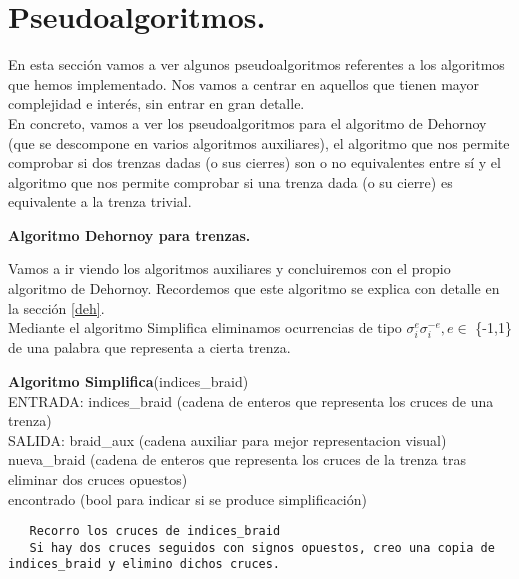
\section{Pseudoalgoritmos.}
En esta sección vamos a ver algunos pseudoalgoritmos referentes a los algoritmos que hemos implementado. Nos vamos a centrar en aquellos que tienen mayor complejidad e interés, sin entrar en gran detalle. \\

En concreto, vamos a ver los pseudoalgoritmos para el algoritmo de Dehornoy (que se descompone en varios algoritmos auxiliares), el algoritmo que nos permite comprobar si dos trenzas dadas (o sus cierres) son o no equivalentes entre sí y el algoritmo que nos permite comprobar si una trenza dada (o su cierre) es equivalente a la trenza trivial.\\

\begin{center}
	\textbf{Algoritmo Dehornoy para trenzas.}
\end{center} 
Vamos a ir viendo los algoritmos auxiliares y concluiremos con el propio algoritmo de Dehornoy. Recordemos que este algoritmo se explica con detalle en la sección \ref{deh}.\\

Mediante el algoritmo Simplifica eliminamos ocurrencias de tipo $\sigma_{i}^{e}\sigma_{i}^{-e}, e \in$ \{-1,1\} de una palabra que representa a cierta trenza. 

\begin{alg}
	\textbf{Algoritmo Simplifica}(indices\_braid)\\
	ENTRADA: indices\_braid (cadena de enteros que representa los cruces de una trenza)\\
	SALIDA: \hspace{0.4cm} braid\_aux (cadena auxiliar para mejor representacion visual) \\
    \hspace*{2.2cm} nueva\_braid (cadena de enteros que representa los cruces de la trenza tras eliminar dos cruces opuestos)\\
    \hspace*{2.2cm} encontrado (bool para indicar si se produce simplificación)
	
\begin{lstlisting}
   Recorro los cruces de indices_braid
   Si hay dos cruces seguidos con signos opuestos, creo una copia de indices_braid y elimino dichos cruces. 
\end{lstlisting}
\end{alg}

